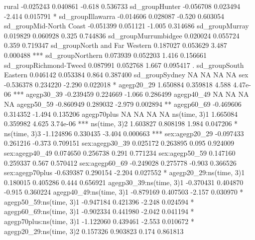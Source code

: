 \documentclass[a4paper]{article}                %
\begin{document}
\begin{Schunk}
\begin{Soutput}
rural                               -0.025243   0.040861  -0.618 0.536733    
sd_groupHunter                      -0.056708   0.023494  -2.414 0.015791 *  
sd_groupIllawarra                   -0.014606   0.028087  -0.520 0.603054    
sd_groupMid-North Coast             -0.051399   0.051121  -1.005 0.314686    
sd_groupMurray                       0.019829   0.060928   0.325 0.744836    
sd_groupMurrumbidgee                 0.020024   0.055724   0.359 0.719347    
sd_groupNorth and Far Western        0.187027   0.053629   3.487 0.000488 ***
sd_groupNorthern                     0.073939   0.052203   1.416 0.156661    
sd_groupRichmond-Tweed               0.087991   0.052768   1.667 0.095417 .  
sd_groupSouth Eastern                0.046142   0.053384   0.864 0.387400    
sd_groupSydney                             NA         NA      NA       NA    
sex                                 -0.536378   0.234220  -2.290 0.022018 *  
agegp20_29                           1.650884   0.359818   4.588 4.47e-06 ***
agegp30_39                          -0.239459   0.224669  -1.066 0.286499    
agegp40_49                                 NA         NA      NA       NA    
agegp50_59                          -0.860949   0.289032  -2.979 0.002894 ** 
agegp60_69                          -0.469606   0.314352  -1.494 0.135206    
agegp70plus                                NA         NA      NA       NA    
ns(time, 3)1                         1.665084   0.359982   4.625 3.74e-06 ***
ns(time, 3)2                         1.603827   0.808198   1.984 0.047206 *  
ns(time, 3)3                        -1.124896   0.330435  -3.404 0.000663 ***
sex:agegp20_29                      -0.097433   0.261216  -0.373 0.709151    
sex:agegp30_39                       0.025172   0.263895   0.095 0.924009    
sex:agegp40_49                       0.074650   0.256738   0.291 0.771234    
sex:agegp50_59                       0.147160   0.259337   0.567 0.570412    
sex:agegp60_69                      -0.249028   0.275778  -0.903 0.366526    
sex:agegp70plus                     -0.639387   0.290154  -2.204 0.027552 *  
agegp20_29:ns(time, 3)1              0.180015   0.405286   0.444 0.656921    
agegp30_39:ns(time, 3)1             -0.370431   0.404870  -0.915 0.360224    
agegp40_49:ns(time, 3)1             -0.879169   0.407503  -2.157 0.030970 *  
agegp50_59:ns(time, 3)1             -0.947184   0.421396  -2.248 0.024594 *  
agegp60_69:ns(time, 3)1             -0.902334   0.441980  -2.042 0.041194 *  
agegp70plus:ns(time, 3)1            -1.122060   0.439461  -2.553 0.010672 *  
agegp20_29:ns(time, 3)2              0.157326   0.903823   0.174 0.861813    

\end{Soutput}
\end{Schunk}
\end{document}
